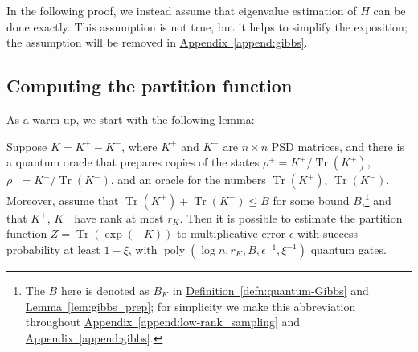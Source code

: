 \documentclass[a4paper,UKenglish,cleveref, autoref]{lipics-v2019}
\theoremstyle{remark}
\numberwithin{equation}{section}
\numberwithin{oracle}{section}
\numberwithin{remark}{section}
\newcommand{\defn}[1]{\hyperref[defn:#1]{Definition~\ref*{defn:#1}}}
\newcommand{\lem}[1]{\hyperref[lem:#1]{Lemma~\ref*{lem:#1}}}
\newcommand{\append}[1]{\hyperref[append:#1]{Appendix~\ref*{append:#1}}}
\DeclareMathOperator{\poly}{poly}
\DeclareMathOperator{\tr}{Tr}
\begin{document}
In the following proof, we instead assume that eigenvalue estimation of $H$ can be done exactly. This assumption is not true, but it helps to simplify the exposition; the assumption will be removed in \append{gibbs}.

\subsection{Computing the partition function}\label{append:partitionFunction}
As a warm-up, we start with the following lemma:
\begin{lemma}\label{lem:partitionFunction}
Suppose $K = K^+ - K^-$, where $K^+$ and $K^-$ are $n \times n$ PSD matrices, and there is a quantum oracle that prepares copies of the states $\rho^+=K^+ / \tr(K^+)$, $\rho^- = K^-/ \tr(K^-)$, and an oracle for the numbers $\tr(K^+)$, $\tr(K^-)$. Moreover, assume that $\tr(K^+) + \tr(K^-) \leq B$ for some bound $B$,\footnote{The $B$ here is denoted as $B_{K}$ in \defn{quantum-Gibbs} and \lem{gibbs_prep}; for simplicity we make this abbreviation throughout \append{low-rank_sampling} and \append{gibbs}.} and that $K^+$, $K^-$ have rank at most $r_{K}$. Then it is possible to estimate the partition function $Z=\tr(\exp(-K))$ to multiplicative error $\epsilon$  with success probability at least $1-\xi$, with $\poly(\log n, r_{K}, B, \epsilon^{-1}, \xi^{-1})$ quantum gates.
\end{lemma}
\end{document}
